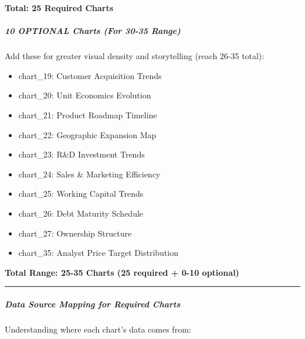 \documentclass[11pt]{article}
\begin{document}
\textbf{Total: 25 Required Charts}


\subparagraph{10 OPTIONAL Charts (For 30-35 Range)}\mbox{}\par

Add these for greater visual density and storytelling (reach 26-35 total):


\begin{itemize}[leftmargin=*,itemsep=2pt,topsep=2pt]
\item {} chart\_\allowbreak{}19: Customer Acquisition Trends
\item {} chart\_\allowbreak{}20: Unit Economics Evolution
\item {} chart\_\allowbreak{}21: Product Roadmap Timeline
\item {} chart\_\allowbreak{}22: Geographic Expansion Map
\item {} chart\_\allowbreak{}23: R\&D Investment Trends
\item {} chart\_\allowbreak{}24: Sales \& Marketing Efficiency
\item {} chart\_\allowbreak{}25: Working Capital Trends
\item {} chart\_\allowbreak{}26: Debt Maturity Schedule
\item {} chart\_\allowbreak{}27: Ownership Structure
\item {} chart\_\allowbreak{}35: Analyst Price Target Distribution
\end{itemize}

\textbf{Total Range: 25-35 Charts (25 required + 0-10 optional)}


\vspace{0.5em}\hrule\vspace{0.5em}

\subparagraph{Data Source Mapping for Required Charts}\mbox{}\par

Understanding where each chart's data comes from:
\end{document}
